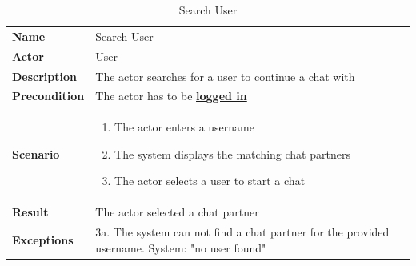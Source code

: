 \begin{table}[ht]
    \caption{Search User}
    \begin{tabular}{|L{5cm}|L{10cm}|}
        \toprule
        \textbf{Name}         & Search User                                                   \\
        \textbf{Actor}        & User                                                          \\
        \textbf{Description}  & The actor searches for a user to continue a chat with         \\
        \textbf{Precondition} & The actor has to be \textbf{\hyperref[tab:table8]{logged in}} \\
        \textbf{Scenario} &
        \vspace{-0.75cm}
        \begin{enumerate}
            \setlength\itemsep{-0.5em}
            \item The actor enters a username
            \item The system displays the matching chat partners
            \item The actor selects a user to start a chat
        \end{enumerate} \\[-0.5cm]
        \textbf{Result}       & The actor selected a chat partner                             \\
        \textbf{Exceptions} & 3a.
        The system can not find a chat partner for the provided username.
        System: "no user found" \\
        \bottomrule
    \end{tabular}
    \label{tab:table11}
\end{table}

